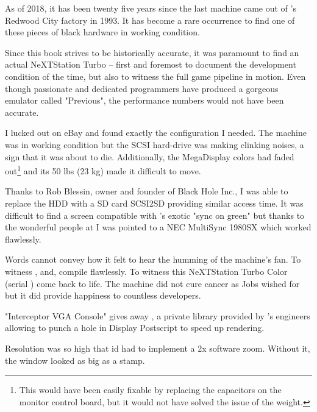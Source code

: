  As of 2018, it has been twenty five years since the last machine came out of \NeXT{}'s Redwood City factory in 1993. It has become a rare occurrence to find one of these pieces of black hardware in working condition.\\
 \par
 Since this book strives to be historically accurate, it was paramount to find an actual NeXTStation Turbo -- first and foremost to document the development condition of the time, but also to witness the full game pipeline in motion. Even though passionate and dedicated programmers have produced a gorgeous emulator called "Previous", the performance numbers would not have been accurate.\\
 \par
  I lucked out on eBay and found exactly the configuration I needed. The machine was in working condition but the SCSI hard-drive was making clinking noises, a sign that it was about to die. Additionally, the MegaDisplay colors had faded out\footnote{This would have been easily fixable by replacing the capacitors on the monitor control board, but it would not have solved the issue of the weight.} and its 50 lbs (23 kg) made it difficult to move.\\
  \par
  Thanks to Rob Blessin, owner and founder of Black Hole Inc., I was able to replace the HDD with a SD card SCSI2SD providing similar access time. It was difficult to find a screen compatible with \NeXTns{}'s exotic "sync on green" but thanks to the wonderful people at  I was pointed to a NEC MultiSync 1980SX which worked flawlessly.\\
  \par
  Words cannot convey how it felt to hear the humming of the machine's fan. To witness ,  and,  compile flawlessly. To witness this NeXTStation Turbo Color (serial ) come back to life. The machine did not cure cancer as Jobs wished for but it did provide happiness to countless developers.

\pagebreak



\par
"Interceptor VGA Console" gives away , a private library provided by \NeXTns's engineers allowing to punch a hole in Display Postscript to speed up rendering. 
\par
\par
{}
\par
Resolution was so high that id had to implement a 2x software zoom. Without it, the \doom{} window looked as big as a stamp.\pagebreak

